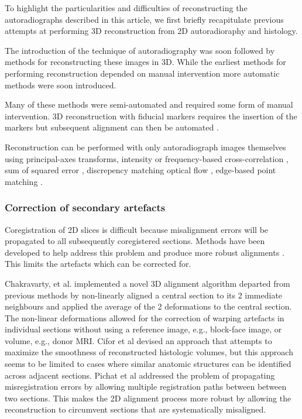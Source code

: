 \documentclass[12pt]{article}
\begin{document}
To highlight the particularities and difficulties of reconstructing the autoradiographs described in this article, we first briefly recapitulate previous attempts at performing 3D reconstruction from 2D autoradioraphy and histology.

The introduction of the technique of autoradiography \cite{Sokoloff1977,Young1979} was soon followed by methods for reconstructing these images in 3D. While the earliest methods for performing reconstruction depended on manual intervention \cite{Hammer1983, Isseroff1983, Stein1984} more automatic methods were soon introduced. 

Many of these methods were semi-automated and required some form of manual intervention. 3D reconstruction with fiducial markers requires the insertion of the markers but subsequent alignment can then be automated \cite{Toga1985, Toga1986, Toga1987}. 

Reconstruction can be performed with only autoradiograph images themselves using principal-axes transforms\cite{Hibbard1984}, intensity or frequency-based cross-correlation \cite{Hibbard1988, Toga1993}, sum of squared error \cite{Andreasen1992}, discrepency matching optical flow \cite{Zhao1993}, edge-based point matching \cite{Rangarajan1997}.  

\subsubsection{Correction of secondary artefacts}

Coregistration of 2D slices is difficult because misalignment errors will be propagated to all subsequently coregistered sections. Methods have been developed to help address this problem and produce more robust alignments \cite{Ourselin2001} \cite{Chakravarty2005} \cite{Cifor2011} \cite{Pichat2015}. This limits the artefacts which can be corrected for.

Chakravarty, et al. \cite{Chakravarty2003,Chakravarty2005} implemented a novel 3D alignment algorithm departed from previous methods by non-linearly aligned a central section to its 2 immediate neighbours and applied the average of the 2 deformations to the central section. The non-linear deformations allowed for the correction of warping artefacts in individual sections without using a reference image, e.g., block-face image, or volume, e.g., donor MRI. 
Cifor et al \cite{Cifor2011} devised an approach that attempts to maximize the smoothness of reconstructed histologic volumes, but this approach seems to be limited to cases where similar anatomic structures can be identified across adjacent sections.  
Pichat et al \cite{Pichat2015} addressed the problem of propagating misregistration errors by allowing  multiple registration paths between between two sections. This makes the 2D alignment process more robust by allowing the reconstruction to circumvent sections that are systematically misaligned. 
\end{document}

